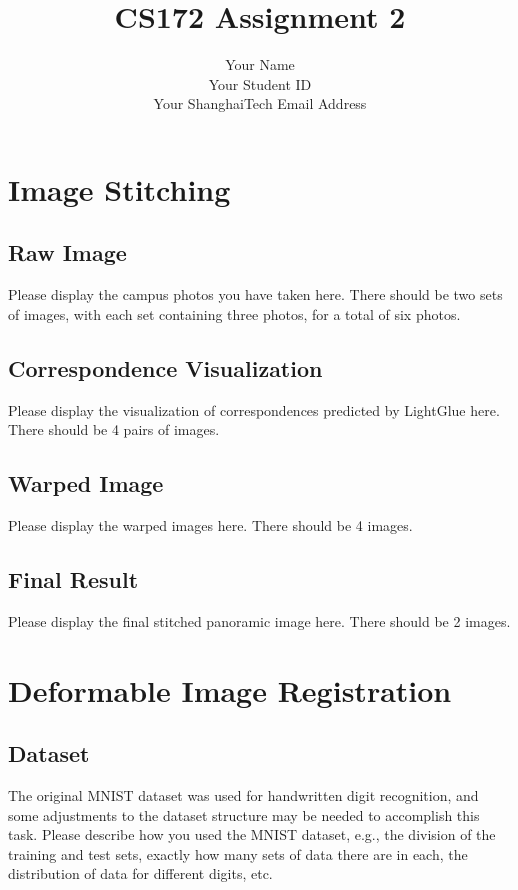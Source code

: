 \documentclass{article}
\title{CS172 Assignment 2}
\author{Your Name\\
Your Student ID\\
Your ShanghaiTech Email Address}
\date{}
\begin{document}
\maketitle

\section{Image Stitching}

\subsection{Raw Image}
Please display the campus photos you have taken here. There should be two sets of images, with each set containing three photos, for a total of six photos.

\subsection{Correspondence Visualization}
Please display the visualization of correspondences predicted by LightGlue here. There should be 4 pairs of images.

\subsection{Warped Image}
Please display the warped images here. There should be 4 images.

\subsection{Final Result}
Please display the final stitched panoramic image here. There should be 2 images.

\newpage

\section{Deformable Image Registration}

\subsection{Dataset}
The original MNIST dataset was used for handwritten digit recognition, and some adjustments to the dataset structure may be needed to accomplish this task. Please describe how you used the MNIST dataset, e.g., the division of the training and test sets, exactly how many sets of data there are in each, the distribution of data for different digits, etc.
\end{document}
